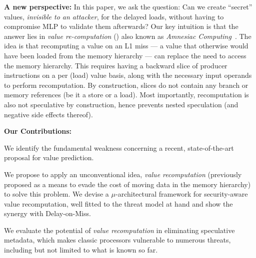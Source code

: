 \noindent \textbf{A new perspective:} In this paper, we ask the question: Can we create ``secret'' values, \emph{invisible to an attacker}, for the delayed loads, without having to compromise MLP to validate them afterwards? Our key intuition is that the answer lies in \emph{value re-computation} (\emph{\recomp})
also known as \emph{Amnesiac Computing}~\cite{amnesiac17}.
The idea is that recomputing a value on an L1 miss --- a value that otherwise would have been loaded from the memory hierarchy --- can replace the need to access the memory hierarchy.
This requires having a backward slice of producer instructions on a per (load) value basis, along with the necessary input operands to perform recomputation. By construction, slices do not contain any branch or memory references (be it a store or a load). 
Most importantly, recomputation is also not speculative by construction, hence prevents nested speculation (and negative side effects thereof).

\noindent \textbf{Our Contributions:} 
\squishlist
\item We identify the fundamental weakness concerning a recent, state-of-the-art proposal for value prediction. 
\item We propose to apply an unconventional idea, \emph{value recomputation} (previously proposed as a means to evade the cost of moving data in the memory hierarchy) to solve this problem. We devise a $\mu$-architectural framework for security-aware value recomputation, well fitted to the 
threat model at hand and show the synergy with Delay-on-Miss.
\item We evaluate the potential of \emph{value recomputation} in eliminating speculative metadata, which makes classic processors vulnerable to numerous threats, including but not limited to what is known so far.  
\squishend

